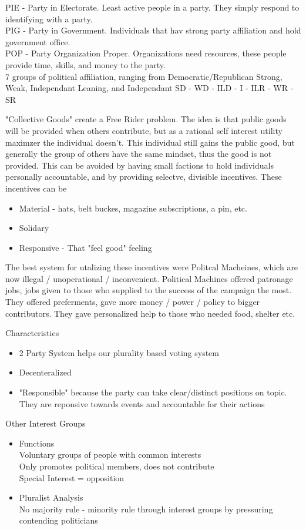 \documentclass{article}
\begin{document}
PIE - Party in Electorate. Least active people in a party. They simply respond to identifying with a party.\\
PIG - Party in Government. Individuals that hav strong party affiliation and hold government office.\\
POP - Party Organization Proper. Organizations need resources, these people provide time, skills, and money to the party.\\

7 groups of political affiliation, ranging from Democratic/Republican Strong, Weak, Independant Leaning, and Independant
SD - WD - ILD - I - ILR - WR - SR

"Collective Goods" create a Free Rider problem. The idea is that public goods will be provided when others contribute, but as a rational self interest utility maximzer the individual doesn't. This individual still gains the public good, but generally the group of others have the same mindset, thus the good is not provided.
This can be avoided by having small factions to hold individuals personally accountable, and by providing selectve, divisible incentives. These incentives can be\\
\begin{itemize}
  \item Material - hats, belt buckes, magazine subscriptions, a pin, etc.
  \item Solidary
  \item Responsive - That "feel good" feeling
\end{itemize}

The best system for utalizing these incentives were Politcal Macheines, which are now illegal / unoperational / inconvenient. Political Machines offered patronage jobs, jobs given to those who supplied to the success of the campaign the most. They offered preferments, gave more money / power / policy to bigger contributors. They gave personalized help to those who needed food, shelter etc.

Characteristics
\begin{itemize}
  \item 2 Party System helps our plurality based voting system
  \item Decenteralized
  \item "Responsible" because the party can take clear/distinct positions on topic. They are reponsive towards events and accountable for their actions
\end{itemize}

Other Interest Groups
\begin{itemize}
  \item Functions\\
  Voluntary groups of people with common interests\\
  Only promotes political members, does not contribute\\
  Special Interest = opposition
  \item Pluralist Analysis\\
  No majority rule - minority rule through interest groups by pressuring contending politicians
\end{itemize}
\end{document}
